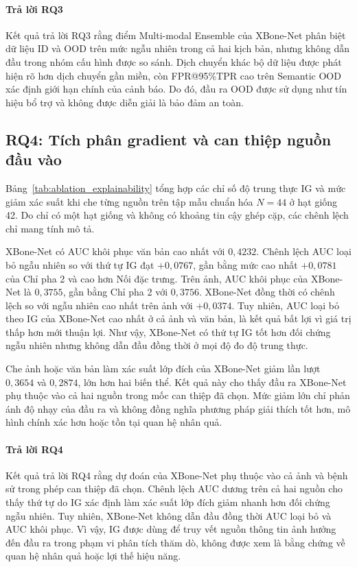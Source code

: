 \paragraph{Trả lời RQ3}
Kết quả trả lời RQ3 rằng điểm Multi-modal Ensemble của XBone-Net phân biệt dữ liệu ID và OOD trên mức ngẫu nhiên trong cả hai kịch bản, nhưng không dẫn đầu trong nhóm cấu hình được so sánh. Dịch chuyển khác bộ dữ liệu được phát hiện rõ hơn dịch chuyển gần miền, còn FPR@95\%TPR cao trên Semantic OOD xác định giới hạn chính của cảnh báo. Do đó, đầu ra OOD được sử dụng như tín hiệu bổ trợ và không được diễn giải là bảo đảm an toàn.

\subsection{RQ4: Tích phân gradient và can thiệp nguồn đầu vào}
\label{subsec:ablation_explainability_results}

Bảng~\ref{tab:ablation_explainability} tổng hợp các chỉ số độ trung thực IG và mức giảm xác suất khi che từng nguồn trên tập mẫu chuẩn hóa $N=44$ ở hạt giống 42. Do chỉ có một hạt giống và không có khoảng tin cậy ghép cặp, các chênh lệch chỉ mang tính mô tả.



XBone-Net có AUC khôi phục văn bản cao nhất với $0{,}4232$. Chênh lệch AUC loại bỏ ngẫu nhiên so với thứ tự IG đạt $+0{,}0767$, gần bằng mức cao nhất $+0{,}0781$ của Chỉ pha 2 và cao hơn Nối đặc trưng. Trên ảnh, AUC khôi phục của XBone-Net là $0{,}3755$, gần bằng Chỉ pha 2 với $0{,}3756$. XBone-Net đồng thời có chênh lệch so với ngẫu nhiên cao nhất trên ảnh với $+0{,}0374$. Tuy nhiên, AUC loại bỏ theo IG của XBone-Net cao nhất ở cả ảnh và văn bản, là kết quả bất lợi vì giá trị thấp hơn mới thuận lợi. Như vậy, XBone-Net có thứ tự IG tốt hơn đối chứng ngẫu nhiên nhưng không dẫn đầu đồng thời ở mọi độ đo độ trung thực.

Che ảnh hoặc văn bản làm xác suất lớp đích của XBone-Net giảm lần lượt $0{,}3654$ và $0{,}2874$, lớn hơn hai biến thể. Kết quả này cho thấy đầu ra XBone-Net phụ thuộc vào cả hai nguồn trong mốc can thiệp đã chọn. Mức giảm lớn chỉ phản ánh độ nhạy của đầu ra và không đồng nghĩa phương pháp giải thích tốt hơn, mô hình chính xác hơn hoặc tồn tại quan hệ nhân quả.

\paragraph{Trả lời RQ4}
Kết quả trả lời RQ4 rằng dự đoán của XBone-Net phụ thuộc vào cả ảnh và bệnh sử trong phép can thiệp đã chọn. Chênh lệch AUC dương trên cả hai nguồn cho thấy thứ tự do IG xác định làm xác suất lớp đích giảm nhanh hơn đối chứng ngẫu nhiên. Tuy nhiên, XBone-Net không dẫn đầu đồng thời AUC loại bỏ và AUC khôi phục. Vì vậy, IG được dùng để truy vết nguồn thông tin ảnh hưởng đến đầu ra trong phạm vi phân tích thăm dò, không được xem là bằng chứng về quan hệ nhân quả hoặc lợi thế hiệu năng.
